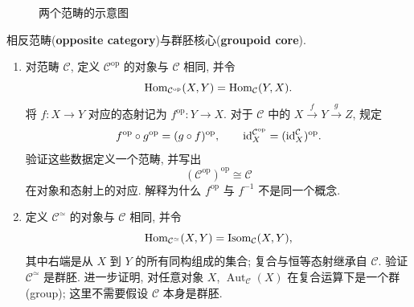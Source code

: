 \documentclass{article}
\newcommand{\op}{^{\mathrm{op}}}
\begin{document}
\begin{solution}
\begin{figure}[htbp]
		\caption{两个范畴的示意图}
		\label{category_sketch}
	\end{figure}
	\FloatBarrier
\end{solution}



\begin{problem}
  {\heiti 相反范畴}(\textbf{opposite category}){\heiti 与群胚核心}(\textbf{groupoid core}).

  \begin{enumerate}
    \item[(a)] 对范畴 $\mathcal C$, 定义 $\mathcal C\op$ 的对象与 $\mathcal C$ 相同, 并令
      \[
        \Hom_{\mathcal C\op}(X,Y)=\Hom_{\mathcal C}(Y,X).
      \]
      将 $f:X\to Y$ 对应的态射记为 $f\op:Y\to X$. 对于 $\mathcal C$ 中的 $X\xrightarrow{f}Y\xrightarrow{g}Z$, 规定
      \[
        f\op\circ g\op=(g\circ f)\op,\qquad
        \id^{\mathcal C\op}_X=(\id^{\mathcal C}_X)\op.
      \]
      验证这些数据定义一个范畴, 并写出
      \[
        (\mathcal C\op)\op\cong\mathcal C
      \]
      在对象和态射上的对应. 解释为什么 $f\op$ 与 $f^{-1}$ 不是同一个概念.

    \item[(b)] 定义 $\mathcal C^{\simeq}$ 的对象与 $\mathcal C$ 相同, 并令
      \[
        \operatorname{Hom}_{\mathcal C^{\simeq}}(X,Y)=\operatorname{Isom}_{\mathcal C}(X,Y),
      \]
      其中右端是从 $X$ 到 $Y$ 的所有同构组成的集合; 复合与恒等态射继承自 $\mathcal C$. 验证 $\mathcal C^{\simeq}$ 是群胚. 进一步证明, 对任意对象 $X$, $\operatorname{Aut}_{\mathcal C}(X)$ 在复合运算下是一个群(group); 这里不需要假设 $\mathcal C$ 本身是群胚.
  \end{enumerate}
\end{problem}
\end{document}
